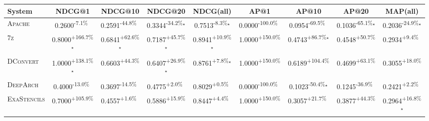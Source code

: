 \begin{table}[htbp]
\centering
\renewcommand{\arraystretch}{1.2}
\begin{tabular}{l|cccc|cccc}
\hline
System & NDCG@1 & NDCG@10 & NDCG@20 & NDCG(all) & AP@1 & AP@10 & AP@20 & MAP(all) \\ \hline
\textsc{Apache} & \cellcolor{red!30}0.2600\textsuperscript{-7.1\%}$^{\,\,\,}$ & \cellcolor{red!30}0.2591\textsuperscript{-44.8\%}$^{\,\,\,}$ & \cellcolor{red!30}0.3344\textsuperscript{-34.2\%}$^\star$ & \cellcolor{red!30}0.7513\textsuperscript{-8.3\%}$^\star$ & \cellcolor{red!30}0.0000\textsuperscript{-100.0\%}$^{\,\,\,}$ & \cellcolor{red!30}0.0954\textsuperscript{-69.5\%}$^{\,\,\,}$ & \cellcolor{red!30}0.1036\textsuperscript{-65.1\%}$^\star$ & \cellcolor{red!30}0.2036\textsuperscript{-24.9\%}$^\star$ \\
\textsc{7z} & \cellcolor{green!30}0.8000\textsuperscript{+166.7\%}$^\star$ & \cellcolor{green!30}0.6841\textsuperscript{+62.6\%}$^\star$ & \cellcolor{green!30}0.7187\textsuperscript{+45.7\%}$^\star$ & \cellcolor{green!30}0.8941\textsuperscript{+10.9\%}$^\star$ & \cellcolor{green!30}1.0000\textsuperscript{+150.0\%}$^{\,\,\,}$ & \cellcolor{green!30}0.4743\textsuperscript{+86.7\%}$^\star$ & \cellcolor{green!30}0.4548\textsuperscript{+50.7\%}$^{\,\,\,}$ & \cellcolor{green!30}0.2934\textsuperscript{+9.4\%}$^{\,\,\,}$ \\
\textsc{DConvert} & \cellcolor{green!30}1.0000\textsuperscript{+138.1\%}$^\star$ & \cellcolor{green!30}0.6603\textsuperscript{+44.3\%}$^{\,\,\,}$ & \cellcolor{green!30}0.6407\textsuperscript{+26.9\%}$^\star$ & \cellcolor{green!30}0.8761\textsuperscript{+7.8\%}$^\star$ & \cellcolor{green!30}1.0000\textsuperscript{+150.0\%}$^{\,\,\,}$ & \cellcolor{green!30}0.6189\textsuperscript{+104.4\%}$^{\,\,\,}$ & \cellcolor{green!30}0.4699\textsuperscript{+63.1\%}$^{\,\,\,}$ & \cellcolor{green!30}0.3055\textsuperscript{+18.0\%}$^{\,\,\,}$ \\
\textsc{DeepArch} & \cellcolor{red!30}0.4000\textsuperscript{-13.0\%}$^{\,\,\,}$ & \cellcolor{red!30}0.3697\textsuperscript{-14.5\%}$^{\,\,\,}$ & \cellcolor{green!30}0.4775\textsuperscript{+2.0\%}$^{\,\,\,}$ & \cellcolor{green!30}0.8029\textsuperscript{+0.5\%}$^{\,\,\,}$ & \cellcolor{red!30}0.0000\textsuperscript{-100.0\%}$^{\,\,\,}$ & \cellcolor{red!30}0.1023\textsuperscript{-50.4\%}$^\star$ & \cellcolor{red!30}0.1245\textsuperscript{-36.9\%}$^{\,\,\,}$ & \cellcolor{green!30}0.2421\textsuperscript{+2.2\%}$^{\,\,\,}$ \\
\textsc{ExaStencils} & \cellcolor{green!30}0.7000\textsuperscript{+105.9\%}$^{\,\,\,}$ & \cellcolor{green!30}0.4557\textsuperscript{+1.6\%}$^{\,\,\,}$ & \cellcolor{green!30}0.5886\textsuperscript{+15.9\%}$^{\,\,\,}$ & \cellcolor{green!30}0.8447\textsuperscript{+4.4\%}$^{\,\,\,}$ & \cellcolor{green!30}1.0000\textsuperscript{+150.0\%}$^{\,\,\,}$ & \cellcolor{green!30}0.3057\textsuperscript{+21.7\%}$^{\,\,\,}$ & \cellcolor{green!30}0.3877\textsuperscript{+44.3\%}$^{\,\,\,}$ & \cellcolor{green!30}0.2964\textsuperscript{+16.8\%}$^\star$ \\

\end{tabular}
\end{table}
